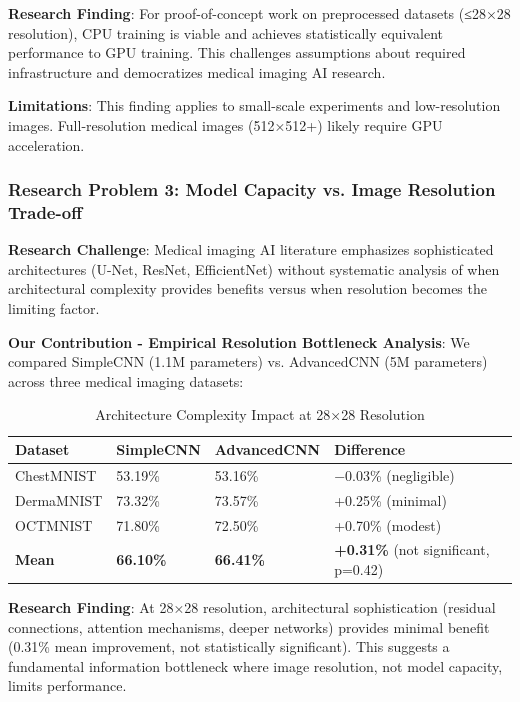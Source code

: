 \documentclass[12pt,a4paper]{article}
\begin{document}
\textbf{Research Finding}: For proof-of-concept work on preprocessed datasets (≤28×28 resolution), CPU training is viable and achieves statistically equivalent performance to GPU training. This challenges assumptions about required infrastructure and democratizes medical imaging AI research.

\textbf{Limitations}: This finding applies to small-scale experiments and low-resolution images. Full-resolution medical images (512×512+) likely require GPU acceleration.

\subsubsection{Research Problem 3: Model Capacity vs. Image Resolution Trade-off}

\textbf{Research Challenge}: Medical imaging AI literature emphasizes sophisticated architectures (U-Net, ResNet, EfficientNet) without systematic analysis of when architectural complexity provides benefits versus when resolution becomes the limiting factor.

\textbf{Our Contribution - Empirical Resolution Bottleneck Analysis}: We compared SimpleCNN (1.1M parameters) vs. AdvancedCNN (5M parameters) across three medical imaging datasets:

\begin{table}[H]
\centering
\caption{Architecture Complexity Impact at 28×28 Resolution}
\begin{tabular}{@{}llll@{}}
\toprule
\textbf{Dataset} & \textbf{SimpleCNN} & \textbf{AdvancedCNN} & \textbf{Difference} \\ \midrule
ChestMNIST & 53.19\% & 53.16\% & −0.03\% (negligible) \\
DermaMNIST & 73.32\% & 73.57\% & +0.25\% (minimal) \\
OCTMNIST & 71.80\% & 72.50\% & +0.70\% (modest) \\
\textbf{Mean} & \textbf{66.10\%} & \textbf{66.41\%} & \textbf{+0.31\%} (not significant, p=0.42) \\
\bottomrule
\end{tabular}
\end{table}

\textbf{Research Finding}: At 28×28 resolution, architectural sophistication (residual connections, attention mechanisms, deeper networks) provides minimal benefit (0.31\% mean improvement, not statistically significant). This suggests a fundamental information bottleneck where image resolution, not model capacity, limits performance.
\end{document}
